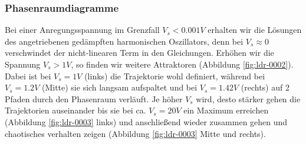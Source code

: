 \documentclass[12pt,a4paper]{article}
\begin{document}
\subsubsection{Phasenraumdiagramme}
Bei einer Anregungsspannung im Grenzfall $V_s < 0.001V$ erhalten wir die Lösungen des angetriebenen gedämpften harmonischen Oszillators, denn bei $V_s \approx 0$ verschwindet der nicht-linearen Term in den Gleichungen.
\newline
Erhöhen wir die Spannung $V_s>1V$, so finden wir weitere Attraktoren (Abbildung \ref{fig:ldr-0002}). Dabei ist bei $V_s=1V$ (links) die Trajektorie wohl definiert, während bei $V_s=1.2V$ (Mitte) sie sich langsam aufspaltet und bei $V_s=1.42V$ (rechts) auf 2 Pfaden durch den Phasenraum verläuft.
Je höher $V_s$ wird, desto stärker gehen die Trajektorien auseinander bis sie bei ca. $V_s=20V$ ein Maximum erreichen (Abbildung \ref{fig:ldr-0003} links) und anschließend wieder zusammen gehen und chaotisches verhalten zeigen (Abbildung \ref{fig:ldr-0003} Mitte und rechts).
\end{document}
